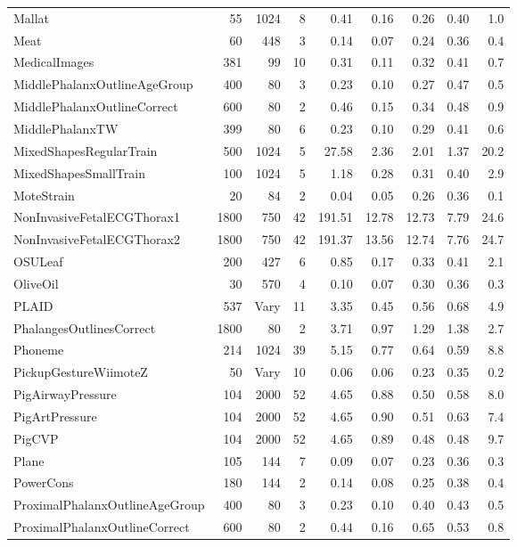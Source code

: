 \documentclass[11pt,landscape]{article}
\begin{document}
\begin{longtable}{lrrrrrrrr}
Mallat & 55 & 1024 & 8 & 0.41 & 0.16 & 0.26 & 0.40 & 1.0 \\
Meat & 60 & 448 & 3 & 0.14 & 0.07 & 0.24 & 0.36 & 0.4 \\
MedicalImages & 381 & 99 & 10 & 0.31 & 0.11 & 0.32 & 0.41 & 0.7 \\
MiddlePhalanxOutlineAgeGroup & 400 & 80 & 3 & 0.23 & 0.10 & 0.27 & 0.47 & 0.5 \\
MiddlePhalanxOutlineCorrect & 600 & 80 & 2 & 0.46 & 0.15 & 0.34 & 0.48 & 0.9 \\
MiddlePhalanxTW & 399 & 80 & 6 & 0.23 & 0.10 & 0.29 & 0.41 & 0.6 \\
\rowcolor{fastrow}MixedShapesRegularTrain & 500 & 1024 & 5 & 27.58 & 2.36 & 2.01 & 1.37 & 20.2 \\
MixedShapesSmallTrain & 100 & 1024 & 5 & 1.18 & 0.28 & 0.31 & 0.40 & 2.9 \\
MoteStrain & 20 & 84 & 2 & 0.04 & 0.05 & 0.26 & 0.36 & 0.1 \\
\rowcolor{fastrow}NonInvasiveFetalECGThorax1 & 1800 & 750 & 42 & 191.51 & 12.78 & 12.73 & 7.79 & 24.6 \\
\rowcolor{fastrow}NonInvasiveFetalECGThorax2 & 1800 & 750 & 42 & 191.37 & 13.56 & 12.74 & 7.76 & 24.7 \\
OSULeaf & 200 & 427 & 6 & 0.85 & 0.17 & 0.33 & 0.41 & 2.1 \\
OliveOil & 30 & 570 & 4 & 0.10 & 0.07 & 0.30 & 0.36 & 0.3 \\
PLAID & 537 & Vary & 11 & 3.35 & 0.45 & 0.56 & 0.68 & 4.9 \\
PhalangesOutlinesCorrect & 1800 & 80 & 2 & 3.71 & 0.97 & 1.29 & 1.38 & 2.7 \\
Phoneme & 214 & 1024 & 39 & 5.15 & 0.77 & 0.64 & 0.59 & 8.8 \\
PickupGestureWiimoteZ & 50 & Vary & 10 & 0.06 & 0.06 & 0.23 & 0.35 & 0.2 \\
PigAirwayPressure & 104 & 2000 & 52 & 4.65 & 0.88 & 0.50 & 0.58 & 8.0 \\
PigArtPressure & 104 & 2000 & 52 & 4.65 & 0.90 & 0.51 & 0.63 & 7.4 \\
PigCVP & 104 & 2000 & 52 & 4.65 & 0.89 & 0.48 & 0.48 & 9.7 \\
Plane & 105 & 144 & 7 & 0.09 & 0.07 & 0.23 & 0.36 & 0.3 \\
PowerCons & 180 & 144 & 2 & 0.14 & 0.08 & 0.25 & 0.38 & 0.4 \\
ProximalPhalanxOutlineAgeGroup & 400 & 80 & 3 & 0.23 & 0.10 & 0.40 & 0.43 & 0.5 \\
ProximalPhalanxOutlineCorrect & 600 & 80 & 2 & 0.44 & 0.16 & 0.65 & 0.53 & 0.8 \\

\end{longtable}
\end{document}
